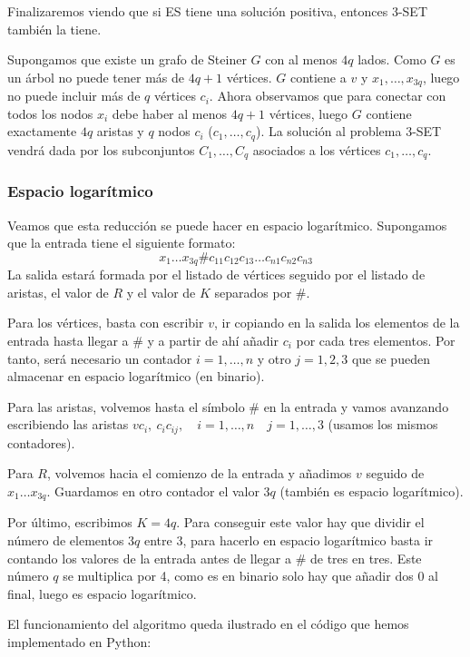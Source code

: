 \documentclass[a4paper, 11pt]{article}
\begin{document}
Finalizaremos viendo que si ES tiene una solución positiva, entonces 3-SET también la tiene.

Supongamos que existe un grafo de Steiner $G$ con al menos $4q$ lados. Como $G$ es un árbol no puede tener más de $4q+1$ vértices. $G$ contiene a $v$ y $x_1,\dots,x_{3q}$, luego no puede incluir más de $q$ vértices $c_i$. Ahora observamos que para conectar con todos los nodos $x_i$ debe haber al menos $4q+1$ vértices, luego $G$ contiene exactamente $4q$ aristas y $q$ nodos $c_i$ ($c_1,\dots,c_q$). La solución al problema 3-SET vendrá dada por los subconjuntos $C_1,\dots,C_q$ asociados a los vértices $c_1,\dots,c_q$.

\subsubsection*{Espacio logarítmico}

Veamos que esta reducción se puede hacer en espacio logarítmico. Supongamos que la entrada tiene el siguiente formato: $$x_1 \dots x_{3q} \# c_{11} c_{12} c_{13} \dots c_{n1} c_{n2} c_{n3}$$ La salida estará formada por el listado de vértices seguido por el listado de aristas, el valor de $R$ y el valor de $K$ separados por $\#$.

Para los vértices, basta con escribir $v$, ir copiando en la salida los elementos de la entrada hasta llegar a $\#$ y a partir de ahí añadir $c_i$ por cada tres elementos. Por tanto, será necesario un contador $i=1,\dots,n$ y otro $j=1,2,3$  que se pueden almacenar en espacio logarítmico (en binario).

Para las aristas, volvemos hasta el símbolo $\#$ en la entrada y vamos avanzando escribiendo las aristas $vc_{i},\ c_ic_{ij}, \quad i=1,\dots,n \quad j=1,\dots,3$ (usamos los mismos contadores).

Para $R$, volvemos hacia el comienzo de la entrada y añadimos $v$ seguido de $x_1 \dots x_{3q}$. Guardamos en otro contador el valor $3q$ (también es espacio logarítmico).

Por último, escribimos $K = 4q$. Para conseguir este valor hay que dividir el número de elementos $3q$ entre 3, para hacerlo en espacio logarítmico basta ir contando los valores de la entrada antes de llegar a $\#$ de tres en tres. Este número $q$ se multiplica por 4, como es en binario solo hay que añadir dos $0$ al final, luego es espacio logarítmico.

El funcionamiento del algoritmo queda ilustrado en el código que hemos implementado en Python:
\end{document}
